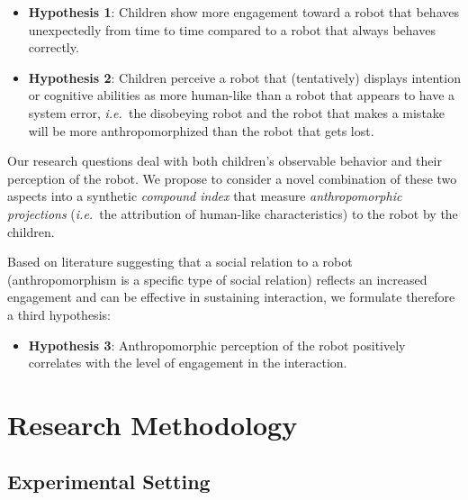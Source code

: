 \documentclass[letterpaper, 10pt, conference]{ieeeconf}
\newcommand{\ie}{{\textit{i.e.~}}}
\begin{document}
\begin{itemize}

    \item {\bf Hypothesis 1}: Children show more engagement toward a robot that
        behaves unexpectedly from time to time compared to a robot that always
        behaves correctly.

    \item {\bf Hypothesis 2}: Children perceive a robot that (tentatively) displays
        intention or cognitive abilities as more human-like than a robot that
        appears to have a system error, \ie the disobeying robot and the robot
        that makes a mistake will be more anthropomorphized than the robot that
        gets lost.

\end{itemize}

Our research questions deal with both children's observable behavior and their
perception of the robot. We propose to consider a novel combination of these two
aspects into a synthetic \emph{compound index} that measure
\emph{anthropomorphic projections} (\ie the attribution of human-like
characteristics) to the robot by the children.

Based on literature suggesting that a social relation to a robot
(anthropomorphism is a specific type of social relation) reflects an increased
engagement and can be effective in sustaining interaction, we formulate
therefore a third hypothesis:

\begin{itemize}

\item {\bf Hypothesis 3}: Anthropomorphic perception of the robot positively
    correlates with the level of engagement in the interaction.
\end{itemize}



\section{Research Methodology}

\subsection{Experimental Setting}
\end{document}
